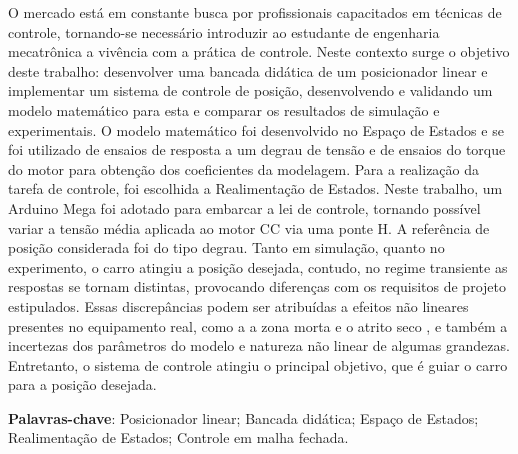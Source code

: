 \begin{resumo} %
O mercado está em constante busca por profissionais capacitados em técnicas de controle, tornando-se necessário introduzir ao estudante de engenharia mecatrônica a vivência com a prática de controle. Neste contexto surge o objetivo deste trabalho: desenvolver uma bancada didática de um posicionador linear e implementar um sistema de controle de posição, desenvolvendo e validando um modelo matemático para esta e comparar os resultados de simulação e experimentais. O modelo matemático foi desenvolvido no Espaço de Estados e se foi utilizado de ensaios de resposta a um degrau de tensão e de ensaios do torque do motor para obtenção dos coeficientes da modelagem. Para a realização da tarefa de controle, foi escolhida a Realimentação de Estados. Neste trabalho, um Arduino Mega foi adotado para embarcar a lei de controle, tornando possível variar a tensão média aplicada ao motor CC via uma ponte H. A referência de posição considerada foi do tipo degrau. Tanto em simulação, quanto no experimento, o carro atingiu a posição desejada, contudo, no regime transiente as respostas se tornam distintas, provocando diferenças com os requisitos de projeto estipulados. Essas discrepâncias podem ser atribuídas a efeitos não lineares presentes no equipamento real, como a a zona morta e o atrito seco , e também a incertezas dos parâmetros do modelo e natureza não linear de algumas grandezas. Entretanto, o sistema de controle atingiu o principal objetivo, que é guiar o carro para a posição desejada.

\vspace{\onelineskip}
    
\noindent
\textbf{Palavras-chave}: Posicionador linear; Bancada didática; Espaço de Estados; Realimentação de Estados; Controle em malha
fechada. %
\end{resumo}